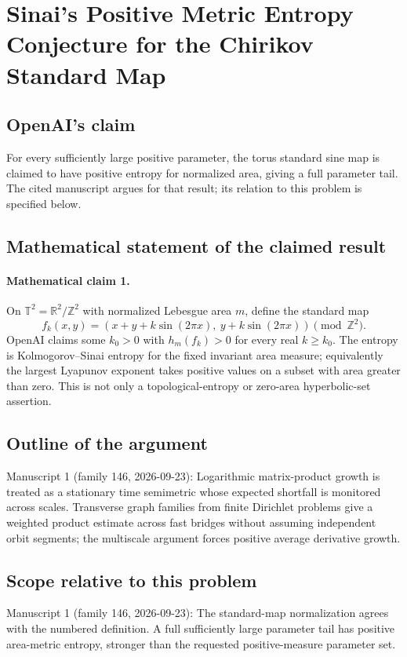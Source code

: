 \documentclass[11pt]{article}
\begin{document}
\section*{Sinai's Positive Metric Entropy Conjecture for the Chirikov Standard Map}

\subsection{OpenAI's claim}
For every sufficiently large positive parameter, the torus standard sine map is claimed to have positive entropy for normalized area, giving a full parameter tail. The cited manuscript argues for that result; its relation to this problem is specified below.

\subsection{Mathematical statement of the claimed result}
\paragraph{Mathematical claim 1.} On $\mathbb T^2=\mathbb R^2/\mathbb Z^2$ with normalized Lebesgue area $m$, define the standard map
\[
f_k(x,y)=(x+y+k\sin(2\pi x),\ y+k\sin(2\pi x))\pmod{\mathbb Z^2}.
\]
OpenAI claims some $k_0>0$ with $h_m(f_k)>0$ for every real $k\ge k_0$. The entropy is Kolmogorov--Sinai entropy for the fixed invariant area measure; equivalently the largest Lyapunov exponent takes positive values on a subset with area greater than zero. This is not only a topological-entropy or zero-area hyperbolic-set assertion.

\subsection{Outline of the argument}
Manuscript 1 (family 146, 2026-09-23): Logarithmic matrix-product growth is treated as a stationary time semimetric whose expected shortfall is monitored across scales. Transverse graph families from finite Dirichlet problems give a weighted product estimate across fast bridges without assuming independent orbit segments; the multiscale argument forces positive average derivative growth.

\subsection{Scope relative to this problem}
Manuscript 1 (family 146, 2026-09-23): The standard-map normalization agrees with the numbered definition. A full sufficiently large parameter tail has positive area-metric entropy, stronger than the requested positive-measure parameter set.
\end{document}
